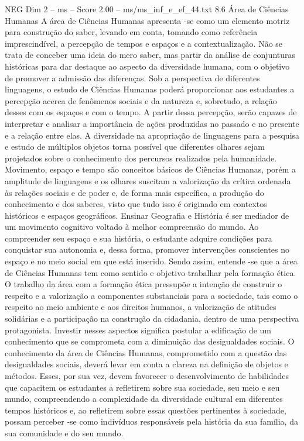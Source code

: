 \begin{textsample}{NEG Dim 2 – ms – Score 2.00 – ms/ms\_inf\_e\_ef\_44.txt}  \label{ex:f2_neg_249}
8.6 Área de Ciências Humanas A área de Ciências Humanas apresenta -se como um elemento motriz para construção do saber, levando em conta, tomando como referência imprescindível, a percepção de tempos e espaços e a contextualização.
Não se trata de conceber uma ideia do mero saber, mas partir da análise de conjunturas históricas para dar destaque ao aspecto da diversidade humana, com o objetivo de promover a admissão das diferenças.
Sob a perspectiva de diferentes linguagens, o estudo de Ciências Humanas poderá proporcionar aos estudantes a percepção acerca de fenômenos sociais e da natureza e, sobretudo, a relação desses com os espaços e com o tempo.
A partir dessa percepção, serão capazes de interpretar e analisar a importância de ações produzidas no passado e no presente e a relação entre elas.
A diversidade na apropriação de linguagens para a pesquisa e estudo de múltiplos objetos torna possível que diferentes olhares sejam projetados sobre o conhecimento dos percursos realizados pela humanidade.
Movimento, espaço e tempo são conceitos básicos de Ciências Humanas, porém a amplitude de linguagens e os olhares suscitam a valorização da crítica ordenada às relações sociais e de poder e, de forma mais específica, a produção do conhecimento e dos saberes, visto que tudo isso é originado em contextos históricos e espaços geográficos.
Ensinar Geografia e História é ser mediador de um movimento cognitivo voltado à melhor compreensão do mundo.
Ao compreender seu espaço e sua história, o estudante adquire condições para conquistar sua autonomia e, dessa forma, promover intervenções conscientes no espaço e no meio social em que está inserido.
Sendo assim, entende -se que a área de Ciências Humanas tem como sentido e objetivo trabalhar pela formação ética.
O trabalho da área com a formação ética pressupõe a intenção de construir o respeito e a valorização a componentes substanciais para a sociedade, tais como o respeito ao meio ambiente e aos direitos humanos, a valorização de atitudes solidárias e a participação na construção da cidadania, dentro de uma perspectiva protagonista.
Investir nesses aspectos significa postular a edificação de um conhecimento que se comprometa com a diminuição das desigualdades sociais.
O conhecimento da área de Ciências Humanas, comprometido com a questão das desigualdades sociais, deverá levar em conta a clareza na definição de objetos e métodos.
Esses, por sua vez, devem favorecer o desenvolvimento de habilidades que capacitem os estudantes a refletirem sobre sua sociedade, seu meio e seu mundo, compreendendo a complexidade da diversidade cultural em diferentes tempos históricos e, ao refletirem sobre essas questões pertinentes à sociedade, possam perceber -se como indivíduos responsáveis pela história da sua família, da sua comunidade e do seu mundo.

\end{textsample}
